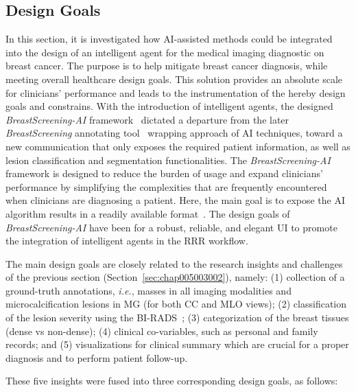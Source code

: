 \subsection{Design Goals}
\label{sec:chap005003003}

In this section, it is investigated how \ac{AI}-assisted methods could be integrated into the design of an intelligent agent for the medical imaging diagnostic on breast cancer.
The purpose is to help mitigate breast cancer diagnosis, while meeting overall healthcare design goals.
This solution provides an absolute scale for clinicians' performance and leads to the instrumentation of the hereby design goals and constrains.
With the introduction of intelligent agents, the designed {\it BreastScreening-AI} framework~\cite{CALISTO2021102607} dictated a departure from the later {\it BreastScreening} annotating tool~\cite{10.1145/3399715.3399744} wrapping approach of \ac{AI} techniques, toward a new communication that only exposes the required patient information, as well as lesion classification and segmentation functionalities.
The {\it BreastScreening-AI} framework is designed to reduce the burden of usage and expand clinicians' performance by simplifying the complexities that are frequently encountered when clinicians are diagnosing a patient.
Here, the main goal is to expose the \ac{AI} algorithm results in a readily available format~\cite{CALISTO2022102285}.
The design goals of {\it BreastScreening-AI} have been for a robust, reliable, and elegant \ac{UI} to promote the integration of intelligent agents in the \ac{RRR} workflow.

The main design goals are closely related to the research insights and challenges of the previous section (Section~\ref{sec:chap005003002}), namely:
(1) collection of a ground-truth annotations, {\it i.e.}, masses in all imaging modalities and microcalcification lesions in \ac{MG} (for both \ac{CC} and \ac{MLO} views);
(2) classification of the lesion severity using the \ac{BI-RADS}~\cite{aghaei2018association};
(3) categorization of the breast tissues (dense vs non-dense);
(4) clinical co-variables, such as personal and family records; and
(5) visualizations for clinical summary which are crucial for a proper diagnosis and to perform patient follow-up.

\noindent
These five insights were fused into three corresponding design goals, as follows:

\vspace{1.00mm}

